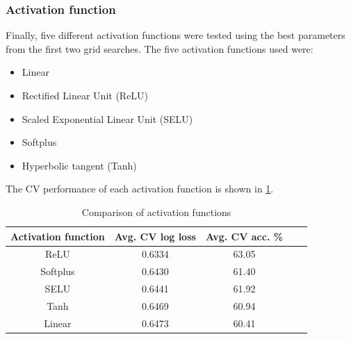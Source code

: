 \subsubsection{Activation function}
Finally, five different activation functions were tested using the best parameters from the first two grid searches. The five activation functions used were:
\begin{itemize}
    \item Linear
    \item Rectified Linear Unit (ReLU)
    \item Scaled Exponential Linear Unit (SELU)
    \item Softplus
    \item Hyperbolic tangent (Tanh)
\end{itemize}
The CV performance of each activation function is shown in \ref{tab:ml100k-activations}.

\begin{table}[H]
\centering
\begin{tabular}{c | c | c | c | c}
\toprule
\textbf{Activation function} & \textbf{Avg. CV log loss} & \textbf{Avg. CV acc.} \% \\
\midrule
ReLU & 0.6334 & 63.05 \\
\midrule
Softplus & 0.6430 & 61.40 \\
\midrule
SELU & 0.6441 & 61.92 \\
\midrule
Tanh & 0.6469 & 60.94 \\
\midrule
Linear & 0.6473 & 60.41 \\
\bottomrule
\end{tabular}
\caption[MovieLens 100K grid search results -- activation function]{Comparison of activation functions}
\label{tab:ml100k-activations}
\end{table}
